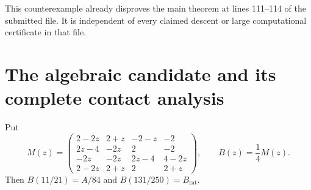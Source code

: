 \documentclass[11pt,reqno]{amsart}
\theoremstyle{definition}
\begin{document}
This counterexample already disproves the main theorem at lines 111--114
of the submitted file. It is independent of every claimed descent or
large computational certificate in that file.

\section{The algebraic candidate and its complete contact analysis}\label{sec:candidate}
Put
\begin{equation}\label{eq:M}
 M(z)=\begin{pmatrix}
2-2z&2+z&-2-z&-2\\
2z-4&-2z&2&-2\\
-2z&-2z&2z-4&4-2z\\
2-2z&2+z&2&2+z
\end{pmatrix},\qquad B(z)=\frac14 M(z).
\end{equation}
Then $B(11/21)=A/84$ and $B(131/250)=B_{\mathrm{rat}}$.
\end{document}
